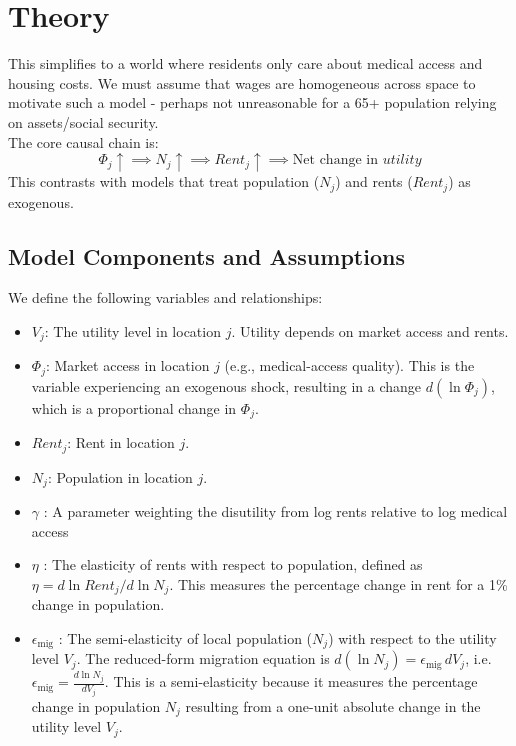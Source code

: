 \documentclass[11pt]{article}
\begin{document}
\newpage

\section{Theory}
This simplifies to a world where residents only care about medical access and housing costs. We must assume that wages are homogeneous across space to motivate such a model - perhaps not unreasonable for a 65+ population relying on assets/social security. \\

The core causal chain is:
$$ \Phi_j \uparrow \implies N_j \uparrow \implies Rent_j \uparrow \implies \text{Net change in } utility $$
This contrasts with models that treat population ($N_j$) and rents ($Rent_j$) as exogenous.

\subsection{Model Components and Assumptions}



We define the following variables and relationships:

\begin{itemize}
    \item $V_j$: The utility level in location $j$. Utility depends on market access and rents. 
    \item $\Phi_j$: Market access in location $j$ (e.g., medical-access quality). This is the variable experiencing an exogenous shock, resulting in a change $d(\ln \Phi_j)$, which is a proportional change in $\Phi_j$.
    \item $Rent_j$: Rent in location $j$.
    \item $N_j$: Population in location $j$.
    \item $\gamma$ : A parameter weighting the disutility from log rents relative to log medical access
    \item $\eta$ : The elasticity of rents with respect to population, defined as $\eta = d\ln Rent_j / d\ln N_j$. This measures the percentage change in rent for a 1\% change in population. 
    \item $\epsilon_{\text{mig}}$ : The semi-elasticity of local population ($N_j$) with respect to the utility level $V_j$. The reduced-form migration equation is $d(\ln N_j) = \epsilon_{\text{mig}} \, dV_j$, i.e.  $\epsilon_{\text{mig}} = \frac{d\ln N_j}{dV_j}$. This is a semi-elasticity because it measures the percentage change in population $N_j$ resulting from a one-unit absolute change in the utility level $V_j$. 
\end{itemize}
\end{document}
